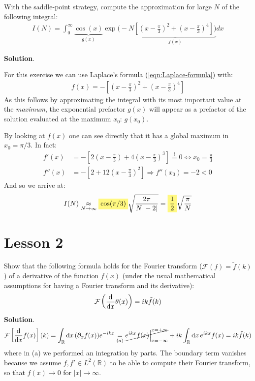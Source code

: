 \documentclass[../template.tex]{subfiles}
\begin{document}
\begin{exo}
    With the saddle-point strategy, compute the approximation for large $N$ of the following integral:
\begin{align*}
    I(N) = \int_{0}^{\infty} \underbrace{\cos(x)}_{g(x)} \exp \Big(-N\underbrace{ \left[\left(x-\frac{\pi}{3} \right)^2 + \left(x-\frac{\pi}{3} \right)^4\right]\Big)}_{f(x)}dx
\end{align*} 

\medskip

\textbf{Solution}. 

For this exercise we can use Laplace's formula (\ref{eqn:Laplace-formula}) with:
\begin{align*}
    f(x) = -\left[\left(x-\frac{\pi}{3} \right)^2 + \left(x-\frac{\pi}{3} \right)^4\right]
\end{align*} 
As this follows by approximating the integral with its most important value at the \textit{maximum}, the exponential prefactor $g(x)$ will appear as a prefactor of the solution evaluated at the maximum $x_0$: $g(x_0)$.
\medskip

By looking at $f(x)$ one can see directly that it has a global maximum in $x_0 = \pi/3$. In fact:  
\begin{align*}
    f'(x) &= -\left[2\left(x-\frac{\pi}{3} \right) + 4\left(x-\frac{\pi}{3} \right)^3 \right] \overset{!}{=} 0 \Leftrightarrow x_0 = \frac{\pi}{3}\\
    f''(x) &= -\left[2+12\left(x-\frac{\pi}{3} \right)^2\right]  \Rightarrow f''(x_0) = -2 < 0
\end{align*} 
And so we arrive at:
\begin{align*}
    I(N) \underset{N \to \infty}{\approx}  \hlc{Yellow}{\cos(\pi/3)} \sqrt{\frac{2\pi}{N|-2|} } = \hlc{Yellow}{\frac{1}{2}} \sqrt{\frac{\pi}{N}}  
\end{align*}
\end{exo}

\chapter{Lesson 2}
\begin{exo}
    Show that the following formula holds for the Fourier transform ($\mathcal{F}(f) = \tilde{f}(k)$) of a derivative of the function $f(x)$ (under the usual mathematical assumptions for having a Fourier transform and its derivative):
    \begin{align*}
        \mathcal{F}\left(\dv{x} \theta(x)\right) = i k \tilde{f}(k)
    \end{align*}
    \medskip
    \textbf{Solution}. 
    \begin{align*}
        \mathcal{F}\left[\dv{x} f(x)\right](k) = \int_{\mathbb{R}} \dd{x} (\partial_x f(x)) e^{-ikx} \underset{(a)}{=} \cancel{e^{ikx} f(x) \Big|_{x=-\infty}^{x=+\infty} }+ ik \int_{\mathbb{R}} \dd{x} e^{ikx} f(x) = ik\tilde{f}(k)
    \end{align*}
    where in (a) we performed an integration by parts. The boundary term vanishes because we assume $f, f' \in L^2(\mathbb{R})$ to be able to compute their Fourier transform, so that $f(x) \to 0$ for $|x| \to \infty$.
\end{exo}
\end{document}
